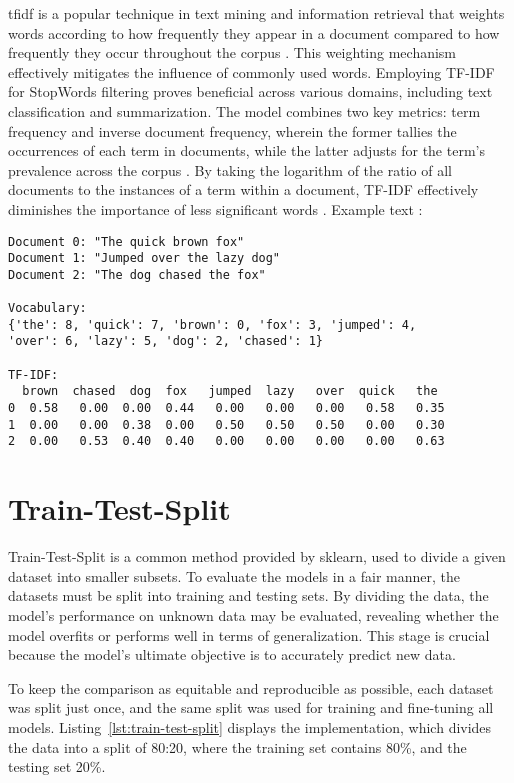 \ac{tfidf} is a popular technique in text mining and information retrieval that weights words according to how frequently they appear in a document compared to how frequently they occur throughout the corpus \citep{vijayarani_preprocessing_2015}. This weighting mechanism effectively mitigates the influence of commonly used words. Employing TF-IDF for StopWords filtering proves beneficial across various domains, including text classification and summarization. The model combines two key metrics: term frequency and inverse document frequency, wherein the former tallies the occurrences of each term in documents, while the latter adjusts for the term's prevalence across the corpus \citep{vijayarani_preprocessing_2015}. By taking the logarithm of the ratio of all documents to the instances of a term within a document, TF-IDF effectively diminishes the importance of less significant words \citep{tabassum_survey_2020}. Example text \citep{openai_gpt3}: 

\begin{verbatim}
Document 0: "The quick brown fox"
Document 1: "Jumped over the lazy dog"
Document 2: "The dog chased the fox"

Vocabulary: 
{'the': 8, 'quick': 7, 'brown': 0, 'fox': 3, 'jumped': 4,
'over': 6, 'lazy': 5, 'dog': 2, 'chased': 1}

TF-IDF:
  brown  chased  dog  fox   jumped  lazy   over  quick   the 
0  0.58   0.00  0.00  0.44   0.00   0.00   0.00   0.58   0.35  
1  0.00   0.00  0.38  0.00   0.50   0.50   0.50   0.00   0.30  
2  0.00   0.53  0.40  0.40   0.00   0.00   0.00   0.00   0.63   
\end{verbatim}

\section{Train-Test-Split}

Train-Test-Split is a common method provided by sklearn, used to divide a given dataset into smaller subsets. To evaluate the models in a fair manner, the datasets must be split into training and testing sets. By dividing the data, the model's performance on unknown data may be evaluated, revealing whether the model overfits or performs well in terms of generalization. This stage is crucial because the model's ultimate objective is to accurately predict new data.

To keep the comparison as equitable and reproducible as possible, each dataset was split just once, and the same split was used for training and fine-tuning all models. Listing~\ref{lst:train-test-split} displays the implementation, which divides the data into a split of 80:20, where the training set contains 80\%, and the testing set 20\%. 


